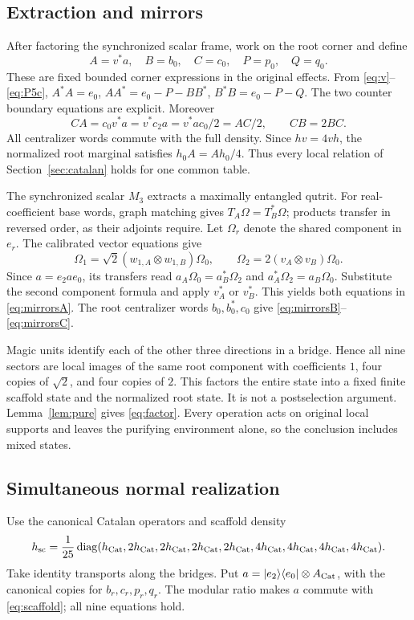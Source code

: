 \subsection{Extraction and mirrors}
After factoring the synchronized scalar frame, work on the root corner and define
\begin{equation}\label{eq:extraction}
 A=v^*a,\quad B=b_0,\quad C=c_0,\quad P=p_0,\quad Q=q_0.
\end{equation}
These are fixed bounded corner expressions in the original effects. From \eqref{eq:v}--\eqref{eq:P5c}, $A^*A=e_0$, $AA^*=e_0-P-BB^*$, $B^*B=e_0-P-Q$. The two counter boundary equations are explicit. Moreover
\[
 CA=c_0v^*a=v^*c_2a=v^*ac_0/2=AC/2,
 \qquad CB=2BC.
\]
All centralizer words commute with the full density. Since $hv=4vh$, the normalized root marginal satisfies $h_0A=Ah_0/4$. Thus every local relation of Section~\ref{sec:catalan} holds for one common table.

The synchronized scalar $M_3$ extracts a maximally entangled qutrit. For real-coefficient base words, graph matching gives $T_A\Omega=T_B^*\Omega$; products transfer in reversed order, as their adjoints require. Let $\Omega_r$ denote the shared component in $e_r$. The calibrated vector equations give
\[
 \Omega_1=\sqrt2(w_{1,A}\otimes w_{1,B})\Omega_0,
 \qquad \Omega_2=2(v_A\otimes v_B)\Omega_0.
\]
Since $a=e_2ae_0$, its transfers read $a_A\Omega_0=a_B^*\Omega_2$ and $a_A^*\Omega_2=a_B\Omega_0$. Substitute the second component formula and apply $v_A^*$ or $v_B^*$. This yields both equations in \eqref{eq:mirrorsA}. The root centralizer words $b_0,b_0^*,c_0$ give \eqref{eq:mirrorsB}--\eqref{eq:mirrorsC}.

Magic units identify each of the other three directions in a bridge. Hence all nine sectors are local images of the same root component with coefficients $1$, four copies of $\sqrt2$, and four copies of $2$. This factors the entire state into a fixed finite scaffold state and the normalized root state. It is not a postselection argument. Lemma~\ref{lem:pure} gives \eqref{eq:factor}. Every operation acts on original local supports and leaves the purifying environment alone, so the conclusion includes mixed states.

\subsection{Simultaneous normal realization}
Use the canonical Catalan operators and scaffold density
\begin{equation}\label{eq:scaffold}
 h_{\rm sc}=\frac1{25}\operatorname{diag}
 (h_{\mathrm{Cat}},2h_{\mathrm{Cat}},2h_{\mathrm{Cat}},2h_{\mathrm{Cat}},2h_{\mathrm{Cat}},
 4h_{\mathrm{Cat}},4h_{\mathrm{Cat}},4h_{\mathrm{Cat}},4h_{\mathrm{Cat}}).
\end{equation}
Take identity transports along the bridges. Put $a=|e_2\rangle\langle e_0|\otimes A_{\rm Cat}$, with the canonical copies for $b_r,c_r,p_r,q_r$. The modular ratio makes $a$ commute with \eqref{eq:scaffold}; all nine equations hold.

